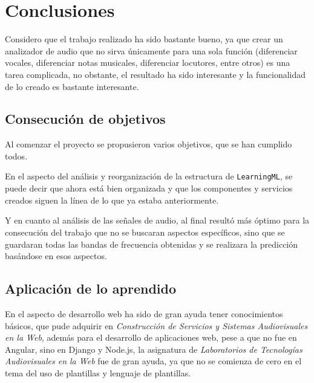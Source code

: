 \documentclass[a4paper, 12pt]{book}
\begin{document}

\cleardoublepage
\chapter{Conclusiones}
\label{chap:conclusiones}

Considero que el trabajo realizado ha sido bastante bueno, ya que crear un analizador de audio que no sirva únicamente para una sola función (diferenciar vocales, diferenciar notas musicales, diferenciar locutores, entre otros) es una tarea complicada, no obstante, el resultado ha sido interesante y la funcionalidad de lo creado es bastante interesante.

\section{Consecución de objetivos}
\label{sec:consecucion-objetivos}

Al comenzar el proyecto se propusieron varios objetivos, que se han cumplido todos.

En el aspecto del análisis y reorganización de la estructura de \texttt{LearningML}, se puede decir que ahora está bien organizada y que los componentes y servicios creados siguen la línea de lo que ya estaba anteriormente.

Y en cuanto al análisis de las señales de audio, al final resultó más óptimo para la consecución del trabajo que no se buscaran aspectos específicos, sino que se guardaran todas las bandas de frecuencia obtenidas y se realizara la predicción basándose en esos aspectos.

\section{Aplicación de lo aprendido}
\label{sec:aplicacion}

En el aspecto de desarrollo web ha sido de gran ayuda tener conocimientos básicos, que pude adquirir en \textit{Construcción de Servicios y Sistemas Audiovisuales en la Web}, además para el desarrollo de aplicaciones web, pese a que no fue en Angular, sino en Django y Node.js, la asignatura de \textit{Laboratorios de Tecnologías Audiovisuales en la Web} fue de gran ayuda, ya que no se comienza de cero en el tema del uso de plantillas y lenguaje de plantillas.
\end{document}
